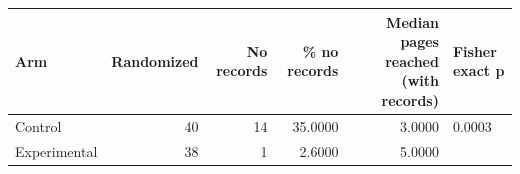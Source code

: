 \begin{tabular}{lrrrrl}
\toprule
Arm & Randomized & No records & \% no records & Median pages reached (with records) & Fisher exact p \\
\midrule
Control & 40 & 14 & 35.0000 & 3.0000 & 0.0003 \\
Experimental & 38 & 1 & 2.6000 & 5.0000 &  \\
\bottomrule
\end{tabular}
